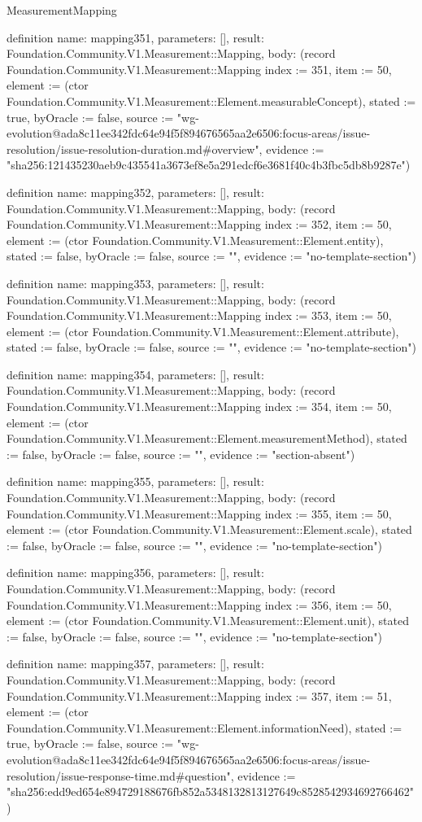 \begin{lexlean}{MeasurementMapping}
\begin{semanticmodule}
definition{
  name: mapping351,
  parameters: [],
  result: Foundation.Community.V1.Measurement::Mapping,
  body: (record Foundation.Community.V1.Measurement::Mapping {index := 351, item := 50, element := (ctor Foundation.Community.V1.Measurement::Element.measurableConcept), stated := true, byOracle := false, source := "wg-evolution@ada8c11ee342fdc64e94f5f894676565aa2e6506:focus-areas/issue-resolution/issue-resolution-duration.md#overview", evidence := "sha256:121435230aeb9c435541a3673ef8e5a291edcf6e3681f40c4b3fbc5db8b9287e"})
}

definition{
  name: mapping352,
  parameters: [],
  result: Foundation.Community.V1.Measurement::Mapping,
  body: (record Foundation.Community.V1.Measurement::Mapping {index := 352, item := 50, element := (ctor Foundation.Community.V1.Measurement::Element.entity), stated := false, byOracle := false, source := "", evidence := "no-template-section"})
}

definition{
  name: mapping353,
  parameters: [],
  result: Foundation.Community.V1.Measurement::Mapping,
  body: (record Foundation.Community.V1.Measurement::Mapping {index := 353, item := 50, element := (ctor Foundation.Community.V1.Measurement::Element.attribute), stated := false, byOracle := false, source := "", evidence := "no-template-section"})
}

definition{
  name: mapping354,
  parameters: [],
  result: Foundation.Community.V1.Measurement::Mapping,
  body: (record Foundation.Community.V1.Measurement::Mapping {index := 354, item := 50, element := (ctor Foundation.Community.V1.Measurement::Element.measurementMethod), stated := false, byOracle := false, source := "", evidence := "section-absent"})
}

definition{
  name: mapping355,
  parameters: [],
  result: Foundation.Community.V1.Measurement::Mapping,
  body: (record Foundation.Community.V1.Measurement::Mapping {index := 355, item := 50, element := (ctor Foundation.Community.V1.Measurement::Element.scale), stated := false, byOracle := false, source := "", evidence := "no-template-section"})
}

definition{
  name: mapping356,
  parameters: [],
  result: Foundation.Community.V1.Measurement::Mapping,
  body: (record Foundation.Community.V1.Measurement::Mapping {index := 356, item := 50, element := (ctor Foundation.Community.V1.Measurement::Element.unit), stated := false, byOracle := false, source := "", evidence := "no-template-section"})
}

definition{
  name: mapping357,
  parameters: [],
  result: Foundation.Community.V1.Measurement::Mapping,
  body: (record Foundation.Community.V1.Measurement::Mapping {index := 357, item := 51, element := (ctor Foundation.Community.V1.Measurement::Element.informationNeed), stated := true, byOracle := false, source := "wg-evolution@ada8c11ee342fdc64e94f5f894676565aa2e6506:focus-areas/issue-resolution/issue-response-time.md#question", evidence := "sha256:edd9ed654e894729188676fb852a5348132813127649c8528542934692766462"})
}


\end{semanticmodule}
\end{lexlean}
